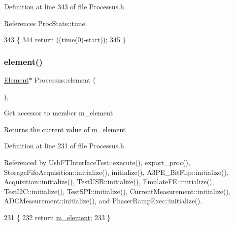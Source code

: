 Definition at line 343 of file Processus.\+h.



References Proc\+State\+::time.


\begin{DoxyCode}
343                                    \{
344     \textcolor{keywordflow}{return} ((time(0)-start));
345   \}
\end{DoxyCode}
\mbox{\label{classProcessus_a6fe155527431a7190b7d44d600b9608d}} 
\subsubsection{\texorpdfstring{element()}{element()}}
{\footnotesize\ttfamily \hyperlink{classElement}{Element}$\ast$ Processus\+::element (\begin{DoxyParamCaption}{ }\end{DoxyParamCaption})\hspace{0.3cm}{\ttfamily [inline]}, {\ttfamily [inherited]}}

Get accessor to member m\+\_\+element \begin{DoxyReturn}{Returns}
the current value of m\+\_\+element 
\end{DoxyReturn}


Definition at line 231 of file Processus.\+h.



Referenced by Usb\+F\+T\+Interface\+Test\+::execute(), export\+\_\+proc(), Storage\+Fifo\+Acquisition\+::initialize(), initialize(), A3\+P\+E\+\_\+\+Bit\+Flip\+::initialize(), Acquisition\+::initialize(), Test\+U\+S\+B\+::initialize(), Emulate\+F\+E\+::initialize(), Test\+I2\+C\+::initialize(), Test\+S\+P\+I\+::initialize(), Current\+Measurement\+::initialize(), A\+D\+C\+Measurement\+::initialize(), and Phaser\+Ramp\+Exec\+::initialize().


\begin{DoxyCode}
231                       \{
232     \textcolor{keywordflow}{return} \hyperlink{classProcessus_aa9d24d53c3e52f36786cabb5d8e296e7}{m\_element};
233   \}
\end{DoxyCode}
\mbox{\label{classProcessus_a5e4da662989d356b89d490b89c7afbfd}} 
